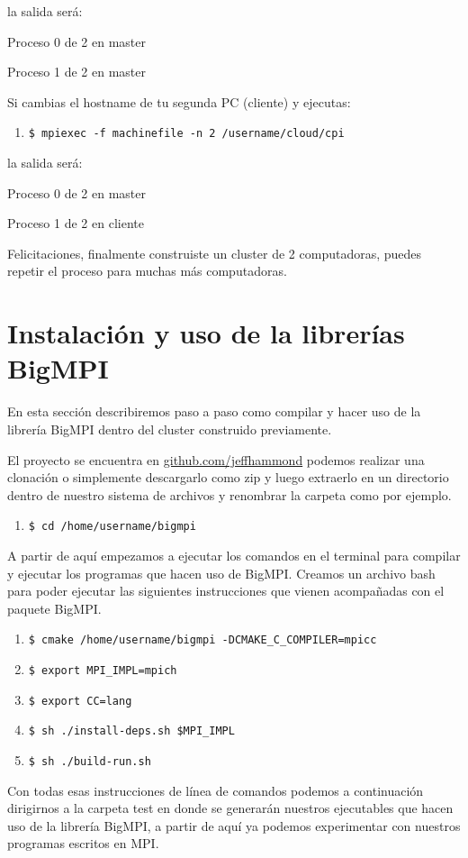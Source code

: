 \documentclass[conference]{IEEEtran}
\begin{document}
la salida será:

Proceso 0 de 2 en master

Proceso 1 de 2 en master

Si cambias el hostname de tu segunda PC (cliente) y ejecutas:
\begin{enumerate}
  \item[] \texttt{\$ mpiexec -f machinefile -n 2 \texttildelow/username/cloud/cpi}
\end{enumerate}

la salida será:

Proceso 0 de 2 en master

Proceso 1 de 2 en cliente

Felicitaciones, finalmente construiste un cluster de 2 computadoras,
puedes repetir el proceso para muchas más computadoras.

\section{Instalación y uso de la librerías BigMPI}
En esta sección describiremos paso a paso como compilar y hacer uso de la librería BigMPI
dentro del cluster construido previamente.

El proyecto se encuentra en \href{https://github.com/jeffhammond/BigMPI}{github.com/jeffhammond}
podemos realizar una clonación o simplemente descargarlo como zip y luego extraerlo en un directorio
dentro de nuestro sistema de archivos y renombrar la carpeta como por ejemplo.
\begin{enumerate}
\item[] \texttt{\$ cd /home/username/bigmpi}
\end{enumerate}
A partir de aquí empezamos a ejecutar los comandos en el terminal para compilar y ejecutar
los programas que hacen uso de BigMPI.
Creamos un archivo bash para poder ejecutar las siguientes instrucciones que vienen
acompañadas con el paquete BigMPI.
\begin{enumerate}
\item[] \texttt{\$ cmake /home/username/bigmpi -DCMAKE\_C\_COMPILER=mpicc}
\item[] \texttt{\$ export MPI\_IMPL=mpich}
\item[] \texttt{\$ export CC=lang}
\item[] \texttt{\$ sh ./install-deps.sh \$MPI\_IMPL}
\item[] \texttt{\$ sh ./build-run.sh}
\end{enumerate}

Con todas esas instrucciones de línea de comandos podemos a continuación dirigirnos
a la carpeta test en donde se generarán nuestros ejecutables que hacen uso de la librería
BigMPI, a partir de aquí ya podemos experimentar con nuestros programas escritos en MPI.
\end{document}

